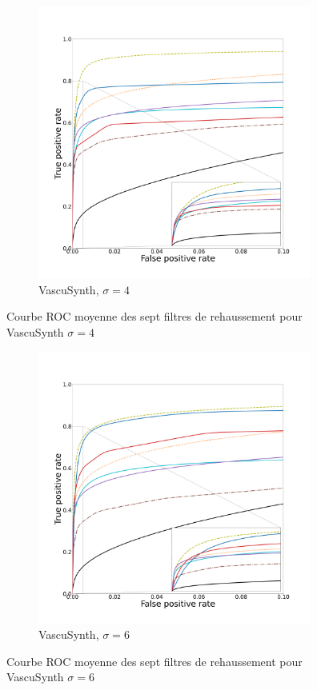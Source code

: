 \begin{figure}[!ht]
  \begin{subfigure}[t]{\textwidth}
    \centering
  \includegraphics[clip = true, trim  =  125 125 100 200, height=9cm]{Images/Vascu_4_ROC.pdf}
  \caption{VascuSynth, $\sigma = 4$}
\end{subfigure}
\caption{Courbe ROC moyenne des sept filtres de rehaussement pour VascuSynth $\sigma=4$}
\end{figure}

\begin{figure}[H]
  \begin{subfigure}[t]{\textwidth}
    \centering
    \includegraphics[clip = true, trim  =  125 125 100 200, height=9cm]{Images/Vascu_6_ROC.pdf}
    \caption{VascuSynth, $\sigma = 6$}
\end{subfigure}
\caption{Courbe ROC moyenne des sept filtres de rehaussement pour VascuSynth $\sigma=6$}
  \label{fig:Vascu6_ROC}
\end{figure}

